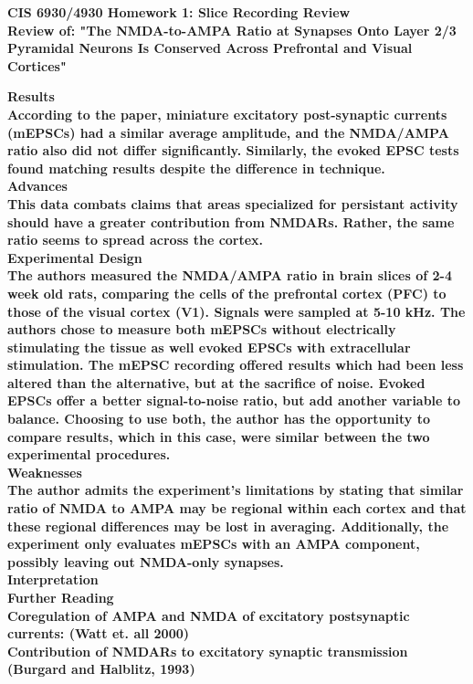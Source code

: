 \documentclass[11pt]{article}
\begin{document}
\begin{center}
{\large {\bf CIS 6930/4930 Homework 1: Slice Recording Review}}\\
{\normalsize {\bf Review of: "The NMDA-to-AMPA Ratio at Synapses Onto Layer 2/3 Pyramidal Neurons
Is Conserved Across Prefrontal and Visual Cortices"}}
\end{center}

\bf{Results}\\
According to the paper, miniature excitatory post-synaptic currents (mEPSCs) had
a similar average amplitude, and the NMDA/AMPA ratio also did not differ significantly.
Similarly, the evoked EPSC tests found matching results despite the difference in
technique. \\

\bf{Advances} \\
This data combats claims that areas specialized for persistant activity should have
a greater contribution from NMDARs.  Rather, the same ratio seems to spread across
the cortex. \\

\bf{Experimental Design} \\
The authors measured the NMDA/AMPA ratio in brain slices of 2-4 week old rats, comparing
the cells of the prefrontal cortex (PFC) to those of the visual cortex (V1).  Signals
were sampled at 5-10 kHz.  The authors chose to measure both mEPSCs without electrically
stimulating the tissue as well evoked EPSCs with extracellular stimulation.  The mEPSC
recording offered results which had been less altered than the alternative, but at
the sacrifice of noise.  Evoked EPSCs offer a better signal-to-noise ratio, but add
another variable to balance.  Choosing to use both, the author has the opportunity
to compare results, which in this case, were similar between the two experimental
procedures. \\

\bf{Weaknesses} \\
The author admits the experiment's limitations by stating that similar ratio of NMDA
to AMPA may be regional within each cortex and that these regional differences may
be lost in averaging.  Additionally, the experiment only evaluates mEPSCs with an
AMPA component, possibly leaving out NMDA-only synapses.  \\

\bf{Interpretation} \\

\bf{Further Reading} \\
Coregulation of AMPA and NMDA of excitatory postsynaptic currents: (Watt et. all 2000) \\
Contribution of NMDARs to excitatory synaptic transmission (Burgard and Halblitz, 1993) \\
\end{document}
